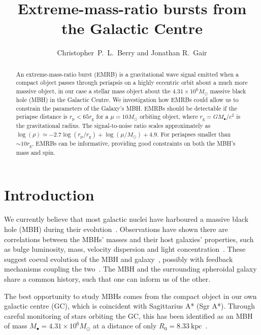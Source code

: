 \documentclass[11pt,twoside]{article}
\begin{document}
\resetcounters

\title{Extreme-mass-ratio bursts from the Galactic Centre}
 \author{Christopher~P.~L.~Berry and Jonathan R.\ Gair }
 
\begin{abstract} 
An extreme-mass-ratio burst (EMRB) is a gravitational wave signal emitted when a compact object passes through periapsis on a highly eccentric orbit about a much more massive object, in our case a stellar mass object about the $4.31 \times 10^6 M_\odot$ massive black hole (MBH) in the Galactic Centre. We investigation how EMRBs could allow us to constrain the parameters of the Galaxy's MBH. EMRBs should be detectable if the periapse distance is $r_\mathrm{p} < 65 r_\mathrm{g}$ for a $\mu = 10 M_\odot$ orbiting object, where $r_\mathrm{g} = GM_\bullet/c^2$ is the gravitational radius. The signal-to-noise ratio scales approximately as $\log(\rho) \simeq -2.7\log(r_\mathrm{p}/r_\mathrm{g}) + \log(\mu/M_\odot) + 4.9$. For periapses smaller than $\sim 10 r_\mathrm{g}$, EMRBs can be informative, providing good constraints on both the MBH's mass and spin.
\end{abstract}

\section{Introduction} 

We currently believe that most galactic nuclei have harboured a massive black hole (MBH) during their evolution~\citep{Lynden-Bell1971, Soltan1982, Rees1984}. Observations have shown there are correlations between the MBHs' masses and their host galaxies' properties, such as bulge luminosity, mass, velocity dispersion and light concentration~\citep{Kormendy1995, Magorrian1998, Ferrarese2000, Gebhardt2000, Graham2001, Tremaine2002, Marconi2003, Haring2004, Graham2007, Graham2011}. These suggest coeval evolution of the MBH and galaxy~\citep{Peng2007, Jahnke2011}, possibly with feedback mechanisms coupling the two~\citep{Haiman2004, Volonteri2009}. The MBH and the surrounding spheroidal galaxy share a common history, such that one can inform us of the other.

The best opportunity to study MBHs comes from the compact object in our own galactic centre (GC), which is coincident with Sagittarius A* (Sgr A*). Through careful monitoring of stars orbiting the GC, this has been identified as an MBH of mass $M_\bullet = 4.31 \times 10^6 M_\odot$ at a distance of only $R_0 = 8.33~\mathrm{kpc}$~\citep{Gillessen2009}.
\end{document}
